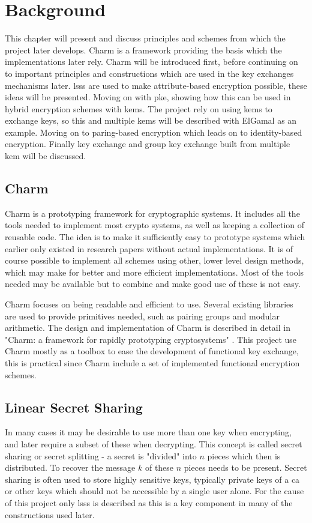 \chapter{Background}
\label{chp:background} 
This chapter will present and discuss principles and schemes from which the project later develops. Charm is a framework providing the basis which the implementations later rely. Charm will be introduced first, before continuing on to important principles and constructions which are used in the key exchanges mechanisms later. \Gls{lsss} are used to make attribute-based encryption possible, these ideas will be presented. Moving on with \gls{pke}, showing how this can be used in hybrid encryption schemes with \glspl{kem}. The project rely on using \glspl{kem} to exchange keys, so this and multiple \glspl{kem} will be described with ElGamal as an example. Moving on to paring-based encryption which leads on to identity-based encryption. Finally key exchange and group key exchange built from multiple \gls{kem} will be discussed.

\section{Charm}
Charm \cite{DBLP:Charm13} is a prototyping framework for cryptographic systems. It includes all the tools needed to implement most crypto systems, as well as keeping a collection of reusable code. The idea is to make it sufficiently easy to prototype systems which earlier only existed in research papers without actual implementations. It is of course possible to implement all schemes using other, lower level design methods, which may make for better and more efficient implementations. Most of the tools needed may be available but to combine and make good use of these is not easy. 
\par Charm focuses on being readable and efficient to use. Several existing libraries are used to provide primitives needed, such as pairing groups and modular arithmetic. The design and implementation of Charm is described in detail in "Charm: a framework for rapidly prototyping cryptosystems" \cite{DBLP:Charm13}. This project use Charm mostly as a toolbox to ease the development of functional key exchange, this is practical since Charm include a set of implemented functional encryption schemes.


\section{Linear Secret Sharing}\label{subsec:lsss}
In many cases it may be desirable to use more than one key when encrypting, and later require a subset of these when decrypting. This concept is called secret sharing or secret splitting - a secret is "divided" into $n$ pieces which then is distributed. To recover the message $k$ of these $n$ pieces needs to be present. Secret sharing is often used to store highly sensitive keys, typically private keys of a \gls{ca} or other keys which should not be accessible by a single user alone. For the cause of this project only \gls{lsss} \cite{lsss} is described as this is a key component in many of the constructions used later. 


